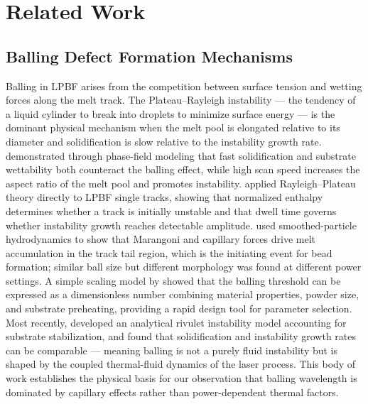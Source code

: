 
\section{Related Work}

\subsection{Balling Defect Formation Mechanisms}

Balling in LPBF arises from the competition between surface
tension and wetting forces along the melt track. The
Plateau--Rayleigh instability — the tendency of a liquid
cylinder to break into droplets to minimize surface energy —
is the dominant physical mechanism when the melt pool is
elongated relative to its diameter and solidification is slow
relative to the instability growth rate.
\citet{li2021phase} demonstrated through phase-field modeling
that fast solidification and substrate wettability both
counteract the balling effect, while high scan speed increases
the aspect ratio of the melt pool and promotes instability.
\citet{zhang2021understanding} applied Rayleigh--Plateau theory
directly to LPBF single tracks, showing that normalized enthalpy
determines whether a track is initially unstable and that dwell
time governs whether instability growth reaches detectable
amplitude. \citet{zoller2023numerical} used smoothed-particle
hydrodynamics to show that Marangoni and capillary forces drive
melt accumulation in the track tail region, which is the
initiating event for bead formation; similar ball size but
different morphology was found at different power settings.
A simple scaling model by \citet{lindstrom2023simple} showed
that the balling threshold can be expressed as a dimensionless
number combining material properties, powder size, and substrate
preheating, providing a rapid design tool for parameter
selection. Most recently, \citet{taylor2025analytical} developed
an analytical rivulet instability model accounting for substrate
stabilization, and found that solidification and instability
growth rates can be comparable — meaning balling is not a
purely fluid instability but is shaped by the coupled
thermal-fluid dynamics of the laser process. This body of
work establishes the physical basis for our observation that
balling wavelength is dominated by capillary effects rather than
power-dependent thermal factors.

